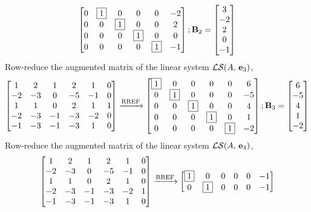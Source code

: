 \documentclass{ximera}
\begin{document}
\begin{example}
\begin{align*}
\begin{bmatrix}
0 & \fbox{1} & 0 & 0 & 0 & -2\\
0 & 0 & \fbox{1} & 0 & 0 & 2\\
0 & 0 & 0 & \fbox{1} & 0 & 0\\
0 & 0 & 0 & 0 & \fbox{1} & -1
\end{bmatrix}
;
\mathbf{B}_2=\begin{bmatrix}3\\-2\\2\\0\\-1\end{bmatrix}\\
\end{align*}
Row-reduce the augmented matrix of the linear system $\mathcal{LS}\!\left(A,\,\mathbf{e}_3\right)$,
\begin{align*}
\begin{bmatrix}
 1 & 2 & 1 & 2 & 1 & 0\\
 -2 & -3 & 0 & -5 & -1 & 0\\
 1 & 1 & 0 & 2 & 1 & 1\\
 -2 & -3 & -1 & -3 & -2 & 0\\
 -1 & -3 & -1 & -3 & 1 & 0
\end{bmatrix}
\xrightarrow{\text{RREF}}
\begin{bmatrix}
\fbox{1} & 0 & 0 & 0 & 0 & 6\\
0 & \fbox{1} & 0 & 0 & 0 & -5\\
0 & 0 & \fbox{1} & 0 & 0 & 4\\
0 & 0 & 0 & \fbox{1} & 0 & 1\\
0 & 0 & 0 & 0 & \fbox{1} & -2
\end{bmatrix}
;
\mathbf{B}_3=\begin{bmatrix}6\\-5\\4\\1\\-2\end{bmatrix}\\
\end{align*}
Row-reduce the augmented matrix of the linear system $\mathcal{LS}\!\left(A,\,\mathbf{e}_4\right)$,
\begin{align*}
\begin{bmatrix}
 1 & 2 & 1 & 2 & 1 & 0\\
 -2 & -3 & 0 & -5 & -1 & 0\\
 1 & 1 & 0 & 2 & 1 & 0\\
 -2 & -3 & -1 & -3 & -2 & 1\\
 -1 & -3 & -1 & -3 & 1 & 0
\end{bmatrix}
\xrightarrow{\text{RREF}}
\begin{bmatrix}
\fbox{1} & 0 & 0 & 0 & 0 & -1\\
0 & \fbox{1} & 0 & 0 & 0 & -1\\

\end{bmatrix}
\end{align*}
\end{example}
\end{document}

